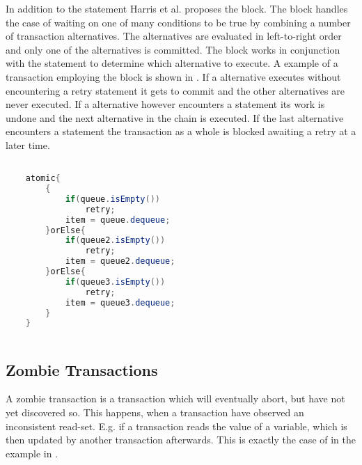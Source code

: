 In addition to the  statement Harris et al. proposes the  block. The  block handles the case of waiting on one of many conditions to be true by combining a number of transaction alternatives. The alternatives are evaluated in left-to-right order and only one of the alternatives is committed\cite[p. 52]{harris2005composable}. The  block works in conjunction with the  statement to determine which alternative to execute. A example of a transaction employing the  block is shown in . If a alternative executes without encountering a retry statement it gets to commit and the other alternatives are never executed\cite[p. 74]{harris2010transactional}. If a alternative however encounters a  statement its work is undone and the next alternative in the chain is executed\cite[p. 74]{harris2010transactional}. If the last alternative encounters a  statement the transaction as a whole is blocked awaiting a retry at a later time\cite[p. 74]{harris2010transactional}.

\begin{lstlisting}[label=lst:stm_orelse,
  caption={The orElse block},
  language=Java,  
  showspaces=false,
  showtabs=false,
  breaklines=true,
  showstringspaces=false,
  breakatwhitespace=true,
  commentstyle=\color{greencomments},
  keywordstyle=\color{bluekeywords},
  stringstyle=\color{redstrings},
  morekeywords={atomic, retry, orElse}]  % Start your code-block

	atomic{
		{
			if(queue.isEmpty())
				retry;
			item = queue.dequeue;
		}orElse{
			if(queue2.isEmpty())
				retry;
			item = queue2.dequeue;
		}orElse{
			if(queue3.isEmpty())
				retry;
			item = queue3.dequeue;
		}
	}
       
\end{lstlisting}

\subsection{Zombie Transactions}
\label{subsec:zombie}
A zombie transaction is a transaction which will eventually abort, but have not yet discovered so. This happens, when a transaction have observed an inconsistent read-set\cite[p. 196]{dice2006transactional}. E.g. if a transaction reads the value of a variable, which is then updated by another transaction afterwards. This is exactly the case of  in the example in . 

